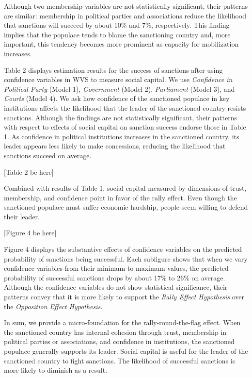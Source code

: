 \documentclass[
  english,
  man]{apa6}
\begin{document}
Although two membership variables are not statistically significant, their patterns are similar: membership in political parties and associations reduce the likelihood that sanctions will succeed by about 10\% and 7\%, respectively. This finding implies that the populace tends to blame the sanctioning country and, more important, this tendency becomes more prominent as capacity for mobilization increases.

Table 2 displays estimation results for the success of sanctions after using confidence variables in WVS to measure social capital. We use \emph{Confidence in Political Party} (Model 1), \emph{Government} (Model 2), \emph{Parliament} (Model 3), and \emph{Courts} (Model 4). We ask how confidence of the sanctioned populace in key institutions affects the likelihood that the leader of the sanctioned country resists sanctions. Although the findings are not statistically significant, their patterns with respect to effects of social capital on sanction success endorse those in Table 1. As confidence in political institutions increases in the sanctioned country, its leader appears less likely to make concessions, reducing the likelihood that sanctions succeed on average.

\begin{center}
[Table 2 be here]
\end{center}

Combined with results of Table 1, social capital measured by dimensions of trust, membership, and confidence point in favor of the rally effect. Even though the sanctioned populace must suffer economic hardship, people seem willing to defend their leader.

\begin{center}
[Figure 4 be here]
\end{center}

Figure 4 displays the substantive effects of confidence variables on the predicted probability of sanctions being successful. Each subfigure shows that when we vary confidence variables from their minimum to maximum values, the predicted probability of successful sanctions drops by about 17\% to 26\% on average. Although the confidence variables do not show statistical significance, their patterns convey that it is more likely to support the \emph{Rally Effect Hypothesis} over the \emph{Opposition Effect Hypothesis}.

In sum, we provide a micro-foundation for the rally-round-the-flag effect. When the sanctioned country has internal cohesion through trust, membership in political parties or associations, and confidence in institutions, the sanctioned populace generally supports its leader. Social capital is useful for the leader of the sanctioned country to fight sanctions. The likelihood of successful sanctions is more likely to diminish as a result.
\end{document}
